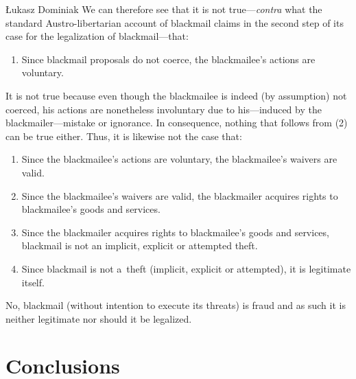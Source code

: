 \begin{artengenv}{Łukasz Dominiak}
We can therefore see that it is not true---\textit{contra} what the standard Austro-libertarian account of blackmail claims in the second step of its case for the legalization of blackmail---that:
\begin{enumerate}[label=(\arabic*), start=2]
\item Since blackmail proposals do not coerce, the blackmailee's actions are voluntary.
\end{enumerate}
It is not true because even though the blackmailee is indeed (by assumption) not coerced, his actions are nonetheless involuntary due to his---induced by the blackmailer---mistake or ignorance. In consequence, nothing that follows from (2) can be true either. Thus, it is likewise not the case that:
\begin{enumerate}[label=(\arabic*), start=3]
\item Since the blackmailee's actions are voluntary, the blackmailee's waivers are valid.
\item Since the blackmailee's waivers are valid, the blackmailer acquires rights to blackmailee's goods and services.
\item Since the blackmailer acquires rights to blackmailee's goods and services, blackmail is not an implicit, explicit or attempted theft.
\item Since blackmail is not a~theft (implicit, explicit or attempted), it is legitimate itself.
\end{enumerate}
No, blackmail (without intention to execute its threats) is fraud and as such it is neither legitimate nor should it be legalized.



\section{Conclusions}


\end{artengenv}
